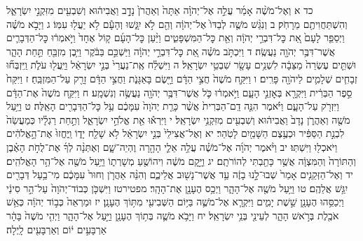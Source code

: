 \documentclass[twoside, openany, parskip=half, 11pt]{book}
\begin{document}
כד א וְאֶל־מֹשֶׁ֨ה אָמַ֜ר עֲלֵ֣ה אֶל־יְהֹוָ֗ה אַתָּה֙ וְאַהֲרֹן֙ נָדָ֣ב וַאֲבִיה֔וּא וְשִׁבְעִ֖ים מִזִּקְנֵ֣י יִשְׂרָאֵ֑ל וְהִשְׁתַּחֲוִיתֶ֖ם מֵרָחֹֽק׃ ב וְנִגַּ֨שׁ מֹשֶׁ֤ה לְבַדּוֹ֙ אֶל־יְהֹוָ֔ה וְהֵ֖ם לֹ֣א יִגָּ֑שׁוּ וְהָעָ֕ם לֹ֥א יַעֲל֖וּ עִמּֽוֹ׃ ג וַיָּבֹ֣א מֹשֶׁ֗ה וַיְסַפֵּ֤ר לָעָם֙ אֵ֚ת כׇּל־דִּבְרֵ֣י יְהֹוָ֔ה וְאֵ֖ת כׇּל־הַמִּשְׁפָּטִ֑ים וַיַּ֨עַן כׇּל־הָעָ֜ם ק֤וֹל אֶחָד֙ וַיֹּ֣אמְר֔וּ כׇּל־הַדְּבָרִ֛ים אֲשֶׁר־דִּבֶּ֥ר יְהֹוָ֖ה נַעֲשֶֽׂה׃ ד וַיִּכְתֹּ֣ב מֹשֶׁ֗ה אֵ֚ת כׇּל־דִּבְרֵ֣י יְהֹוָ֔ה וַיַּשְׁכֵּ֣ם בַּבֹּ֔קֶר וַיִּ֥בֶן מִזְבֵּ֖חַ תַּ֣חַת הָהָ֑ר וּשְׁתֵּ֤ים עֶשְׂרֵה֙ מַצֵּבָ֔ה לִשְׁנֵ֥ים עָשָׂ֖ר שִׁבְטֵ֥י יִשְׂרָאֵֽל׃ ה וַיִּשְׁלַ֗ח אֶֽת־נַעֲרֵי֙ בְּנֵ֣י יִשְׂרָאֵ֔ל וַיַּֽעֲל֖וּ עֹלֹ֑ת וַֽיִּזְבְּח֞וּ זְבָחִ֧ים שְׁלָמִ֛ים לַיהֹוָ֖ה פָּרִֽים׃ ו וַיִּקַּ֤ח מֹשֶׁה֙ חֲצִ֣י הַדָּ֔ם וַיָּ֖שֶׂם בָּאַגָּנֹ֑ת וַחֲצִ֣י הַדָּ֔ם זָרַ֖ק עַל־הַמִּזְבֵּֽחַ׃ ז וַיִּקַּח֙ סֵ֣פֶר הַבְּרִ֔ית וַיִּקְרָ֖א בְּאׇזְנֵ֣י הָעָ֑ם וַיֹּ֣אמְר֔וּ כֹּ֛ל אֲשֶׁר־דִּבֶּ֥ר יְהֹוָ֖ה נַעֲשֶׂ֥ה וְנִשְׁמָֽע׃ ח וַיִּקַּ֤ח מֹשֶׁה֙ אֶת־הַדָּ֔ם וַיִּזְרֹ֖ק עַל־הָעָ֑ם וַיֹּ֗אמֶר הִנֵּ֤ה דַֽם־הַבְּרִית֙ אֲשֶׁ֨ר כָּרַ֤ת יְהֹוָה֙ עִמָּכֶ֔ם עַ֥ל כׇּל־הַדְּבָרִ֖ים הָאֵֽלֶּה׃ ט וַיַּ֥עַל מֹשֶׁ֖ה וְאַהֲרֹ֑ן נָדָב֙ וַאֲבִיה֔וּא וְשִׁבְעִ֖ים מִזִּקְנֵ֥י יִשְׂרָאֵֽל׃ י וַיִּרְא֕וּ אֵ֖ת אֱלֹהֵ֣י יִשְׂרָאֵ֑ל וְתַ֣חַת רַגְלָ֗יו כְּמַעֲשֵׂה֙ לִבְנַ֣ת הַסַּפִּ֔יר וּכְעֶ֥צֶם הַשָּׁמַ֖יִם לָטֹֽהַר׃ יא וְאֶל־אֲצִילֵי֙ בְּנֵ֣י יִשְׂרָאֵ֔ל לֹ֥א שָׁלַ֖ח יָד֑וֹ וַֽיֶּחֱזוּ֙ אֶת־הָ֣אֱלֹהִ֔ים וַיֹּאכְל֖וּ וַיִּשְׁתּֽוּ׃
יב וַיֹּ֨אמֶר יְהֹוָ֜ה אֶל־מֹשֶׁ֗ה עֲלֵ֥ה אֵלַ֛י הָהָ֖רָה וֶהְיֵה־שָׁ֑ם וְאֶתְּנָ֨ה לְךָ֜ אֶת־לֻחֹ֣ת הָאֶ֗בֶן וְהַתּוֹרָה֙ וְהַמִּצְוָ֔ה אֲשֶׁ֥ר כָּתַ֖בְתִּי לְהוֹרֹתָֽם׃ יג וַיָּ֣קׇם מֹשֶׁ֔ה וִיהוֹשֻׁ֖עַ מְשָׁרְת֑וֹ וַיַּ֥עַל מֹשֶׁ֖ה אֶל־הַ֥ר הָאֱלֹהִֽים׃ יד וְאֶל־הַזְּקֵנִ֤ים אָמַר֙ שְׁבוּ־לָ֣נוּ בָזֶ֔ה עַ֥ד אֲשֶׁר־נָשׁ֖וּב אֲלֵיכֶ֑ם וְהִנֵּ֨ה אַהֲרֹ֤ן וְחוּר֙ עִמָּכֶ֔ם מִי־בַ֥עַל דְּבָרִ֖ים יִגַּ֥שׁ אֲלֵהֶֽם׃ טו וַיַּ֥עַל מֹשֶׁ֖ה אֶל־הָהָ֑ר וַיְכַ֥ס הֶעָנָ֖ן אֶת־הָהָֽר׃ מפטירטז וַיִּשְׁכֹּ֤ן כְּבוֹד־יְהֹוָה֙ עַל־הַ֣ר סִינַ֔י וַיְכַסֵּ֥הוּ הֶעָנָ֖ן שֵׁ֣שֶׁת יָמִ֑ים וַיִּקְרָ֧א אֶל־מֹשֶׁ֛ה בַּיּ֥וֹם הַשְּׁבִיעִ֖י מִתּ֥וֹךְ הֶעָנָֽן׃ יז וּמַרְאֵה֙ כְּב֣וֹד יְהֹוָ֔ה כְּאֵ֥שׁ אֹכֶ֖לֶת בְּרֹ֣אשׁ הָהָ֑ר לְעֵינֵ֖י בְּנֵ֥י יִשְׂרָאֵֽל׃ יח וַיָּבֹ֥א מֹשֶׁ֛ה בְּת֥וֹךְ הֶעָנָ֖ן וַיַּ֣עַל אֶל־הָהָ֑ר וַיְהִ֤י מֹשֶׁה֙ בָּהָ֔ר אַרְבָּעִ֣ים י֔וֹם וְאַרְבָּעִ֖ים לָֽיְלָה׃
\end{document}
